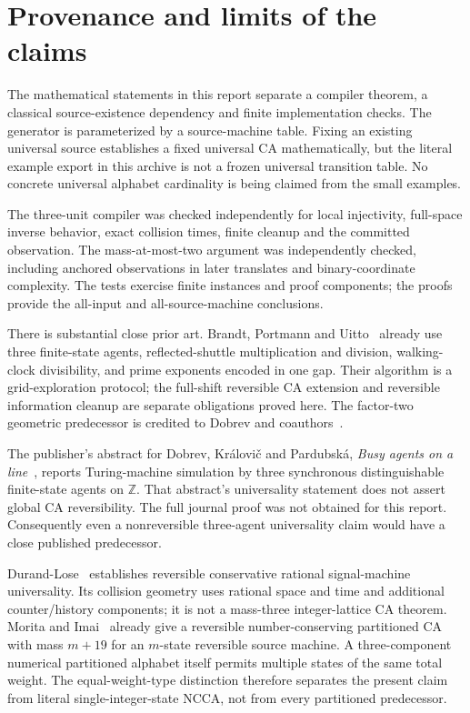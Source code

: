 \documentclass[11pt,letterpaper]{article}
\numberwithin{equation}{section}
\theoremstyle{definition}
\theoremstyle{remark}
\newcommand{\Z}{\mathbb Z}
\begin{document}
\section{Provenance and limits of the claims}\label{smc:tm:sec:limits}

The mathematical statements in this report separate a compiler theorem, a classical source-existence dependency and finite implementation checks. The generator is parameterized by a source-machine table. Fixing an existing universal source establishes a fixed universal CA mathematically, but the literal example export in this archive is not a frozen universal transition table. No concrete universal alphabet cardinality is being claimed from the small examples.

The three-unit compiler was checked independently for local injectivity, full-space inverse behavior, exact collision times, finite cleanup and the committed observation. The mass-at-most-two argument was independently checked, including anchored observations in later translates and binary-coordinate complexity. The tests exercise finite instances and proof components; the proofs provide the all-input and all-source-machine conclusions.

There is substantial close prior art. Brandt, Portmann and Uitto~\cite{brandt2020} already use three finite-state agents, reflected-shuttle multiplication and division, walking-clock divisibility, and prime exponents encoded in one gap. Their algorithm is a grid-exploration protocol; the full-shift reversible CA extension and reversible information cleanup are separate obligations proved here. The factor-two geometric predecessor is credited to Dobrev and coauthors~\cite{dobrev2019}.

The publisher's abstract for Dobrev, Kr\'{a}lovi\v{c} and Pardubsk\'{a}, \emph{Busy agents on a line}~\cite{busy2026}, reports Turing-machine simulation by three synchronous distinguishable finite-state agents on $\Z$. That abstract's universality statement does not assert global CA reversibility. The full journal proof was not obtained for this report. Consequently even a nonreversible three-agent universality claim would have a close published predecessor.

Durand-Lose~\cite{DL06} establishes reversible conservative rational signal-machine universality. Its collision geometry uses rational space and time and additional counter/history components; it is not a mass-three integer-lattice CA theorem. Morita and Imai~\cite{moritaimai} already give a reversible number-conserving partitioned CA with mass $m+19$ for an $m$-state reversible source machine. A three-component numerical partitioned alphabet itself permits multiple states of the same total weight. The equal-weight-type distinction therefore separates the present claim from literal single-integer-state NCCA, not from every partitioned predecessor.
\end{document}
